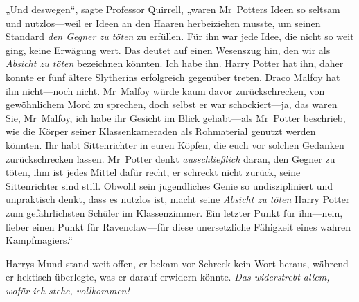 „Und deswegen“, sagte Professor Quirrell, „waren Mr~Potters Ideen so seltsam und nutzlos—weil er Ideen an den Haaren herbeiziehen musste, um seinen Standard \emph{den Gegner zu töten} zu erfüllen. Für ihn war jede Idee, die nicht so weit ging, keine Erwägung wert. Das deutet auf einen Wesenszug hin, den wir als \emph{Absicht zu töten} bezeichnen könnten. Ich habe ihn. Harry Potter hat ihn, daher konnte er fünf ältere Slytherins erfolgreich gegenüber treten. Draco Malfoy hat ihn nicht—noch nicht. Mr~Malfoy würde kaum davor zurückschrecken, von gewöhnlichem Mord zu sprechen, doch selbst er war schockiert—ja, das waren Sie, Mr~Malfoy, ich habe ihr Gesicht im Blick gehabt—als Mr~Potter beschrieb, wie die Körper seiner Klassenkameraden als Rohmaterial genutzt werden könnten. Ihr habt Sittenrichter in euren Köpfen, die euch vor solchen Gedanken zurückschrecken lassen. Mr~Potter denkt \emph{ausschließlich} daran, den Gegner zu töten, ihm ist jedes Mittel dafür recht, er schreckt nicht zurück, seine Sittenrichter sind still. Obwohl sein jugendliches Genie so undiszipliniert und unpraktisch denkt, dass es nutzlos ist, macht seine \emph{Absicht zu töten} Harry Potter zum gefährlichsten Schüler im Klassenzimmer. Ein letzter Punkt für ihn—nein, lieber einen Punkt für Ravenclaw—für diese unersetzliche Fähigkeit eines wahren Kampfmagiers.“

Harrys Mund stand weit offen, er bekam vor Schreck kein Wort heraus, während er hektisch überlegte, was er darauf erwidern könnte. \emph{Das widerstrebt allem, wofür ich stehe, vollkommen!}

